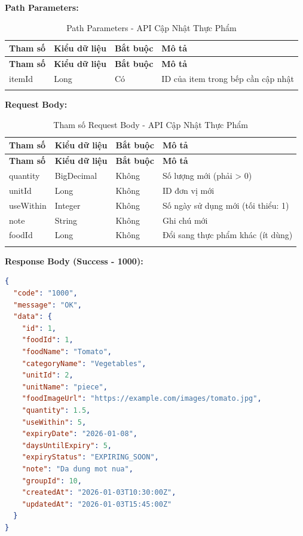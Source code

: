 \textbf{Path Parameters:}

\small
\begin{longtable}{|>{\raggedright\arraybackslash}p{3cm}|>{\raggedright\arraybackslash}p{2.5cm}|>{\raggedright\arraybackslash}p{2cm}|>{\raggedright\arraybackslash}p{6cm}|}
\hline
\textbf{Tham số} & \textbf{Kiểu dữ liệu} & \textbf{Bắt buộc} & \textbf{Mô tả} \\
\hline
\endfirsthead
\hline
\textbf{Tham số} & \textbf{Kiểu dữ liệu} & \textbf{Bắt buộc} & \textbf{Mô tả} \\
\hline
\endhead
itemId & Long & Có & ID của item trong bếp cần cập nhật \\
\hline
\caption{Path Parameters - API Cập Nhật Thực Phẩm}
\end{longtable}

\textbf{Request Body:}

\small
\begin{longtable}{|>{\raggedright\arraybackslash}p{3.5cm}|>{\raggedright\arraybackslash}p{2.5cm}|>{\raggedright\arraybackslash}p{2cm}|>{\raggedright\arraybackslash}p{5.5cm}|}
\hline
\textbf{Tham số} & \textbf{Kiểu dữ liệu} & \textbf{Bắt buộc} & \textbf{Mô tả} \\
\hline
\endfirsthead
\hline
\textbf{Tham số} & \textbf{Kiểu dữ liệu} & \textbf{Bắt buộc} & \textbf{Mô tả} \\
\hline
\endhead
quantity & BigDecimal & Không & Số lượng mới (phải > 0) \\
\hline
unitId & Long & Không & ID đơn vị mới \\
\hline
useWithin & Integer & Không & Số ngày sử dụng mới (tối thiểu: 1) \\
\hline
note & String & Không & Ghi chú mới \\
\hline
foodId & Long & Không & Đổi sang thực phẩm khác (ít dùng) \\
\hline
\caption{Tham số Request Body - API Cập Nhật Thực Phẩm}
\end{longtable}

\textbf{Response Body (Success - 1000):}

\begin{lstlisting}[language=json, caption=Response thanh cong API 3.5]
{
  "code": "1000",
  "message": "OK",
  "data": {
    "id": 1,
    "foodId": 1,
    "foodName": "Tomato",
    "categoryName": "Vegetables",
    "unitId": 2,
    "unitName": "piece",
    "foodImageUrl": "https://example.com/images/tomato.jpg",
    "quantity": 1.5,
    "useWithin": 5,
    "expiryDate": "2026-01-08",
    "daysUntilExpiry": 5,
    "expiryStatus": "EXPIRING_SOON",
    "note": "Da dung mot nua",
    "groupId": 10,
    "createdAt": "2026-01-03T10:30:00Z",
    "updatedAt": "2026-01-03T15:45:00Z"
  }
}
\end{lstlisting}

